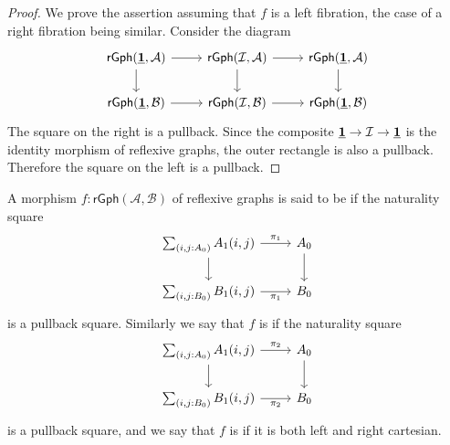 \begin{proof}
We prove the assertion assuming that $f$ is a left fibration, the case of a right fibration being similar. Consider the diagram
\begin{equation*}
\begin{tikzcd}
\mathsf{rGph}(\unit,\mathcal{A}) \arrow[d] \arrow[r] & \mathsf{rGph}(\mathcal{I},\mathcal{A}) \arrow[r] \arrow[d] & \mathsf{rGph}(\unit,\mathcal{A}) \arrow[d] \\
\mathsf{rGph}(\unit,\mathcal{B}) \arrow[r] & \mathsf{rGph}(\mathcal{I},\mathcal{B}) \arrow[r] & \mathsf{rGph}(\unit,\mathcal{B})
\end{tikzcd}
\end{equation*}
The square on the right is a pullback. Since the composite $\underline{\mathbf{1}} \to \mathcal{I}\to \underline{\mathbf{1}}$ is the identity morphism of reflexive graphs, the outer rectangle is also a pullback. Therefore the square on the left is a pullback.
\end{proof}

\begin{defn}
A morphism $f:\mathsf{rGph}(\mathcal{A},\mathcal{B})$ of reflexive graphs is said to be  if the naturality square
\begin{equation*}
\begin{tikzcd}
\sm{i,j:\pts{A}}\edg{A}(i,j) \arrow[d] \arrow[r,"\pi_1"] & \pts{A} \arrow[d] \\
\sm{i,j:\pts{B}}\edg{B}(i,j) \arrow[r,swap,"\pi_1"] & \pts{B}
\end{tikzcd}
\end{equation*}
is a pullback square. Similarly we say that $f$ is  if the naturality square
\begin{equation*}
\begin{tikzcd}
\sm{i,j:\pts{A}}\edg{A}(i,j) \arrow[d] \arrow[r,"\pi_2"] & \pts{A} \arrow[d] \\
\sm{i,j:\pts{B}}\edg{B}(i,j) \arrow[r,swap,"\pi_2"] & \pts{B}
\end{tikzcd}
\end{equation*}
is a pullback square, and we say that $f$ is  if it is both left and right cartesian.
\end{defn}

